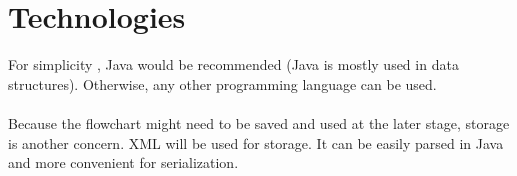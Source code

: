 \documentclass[12pt]{article}
\begin{document}
\section{Technologies}
For simplicity , Java would be recommended (Java is mostly used in data structures). Otherwise, any other programming language can be used.\\ \\
Because the flowchart might need to be saved and used at the later stage, storage is another concern. XML will be used for storage. It can be easily parsed in Java and more convenient for serialization.
\end{document}
